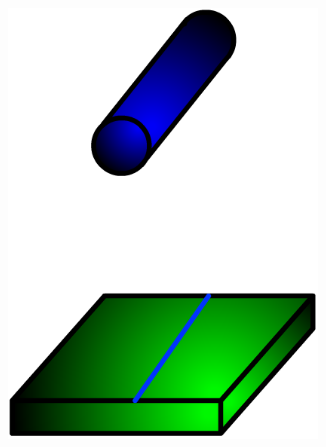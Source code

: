 \documentclass[10pt,fleqn,draft]{article} %
\begin{document}
\begin{figure}[h]
\begin{subfigure}[b]{0.3\textwidth}
    \includegraphics[width=0.9\textwidth,height=.2\textheight,keepaspectratio]{images/cylindre-plan}
    \caption{}
  \end{subfigure}\hfill
  \begin{subfigure}[b]{0.3\textwidth}
    \centering

\end{subfigure}
\end{figure}
\end{document}
